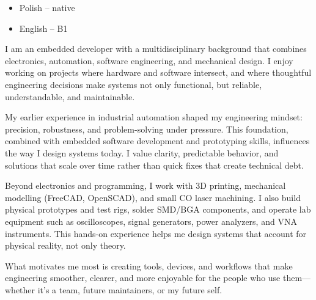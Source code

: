\documentclass[9pt]{developercv}
\begin{document}
\vspace{0.5cm}

\begin{minipage}[t]{0.3\textwidth}
	\vspace{-\baselineskip}
	
	\begin{itemize}
		\item Polish – native
		\item English – B1
	\end{itemize}
\end{minipage}


\vfill


\clearpage


I am an embedded developer with a multidisciplinary background that combines electronics,
automation, software engineering, and mechanical design. I enjoy working on projects where
hardware and software intersect, and where thoughtful engineering decisions make systems
not only functional, but reliable, understandable, and maintainable.

My earlier experience in industrial automation shaped my engineering mindset: precision,
robustness, and problem-solving under pressure. This foundation, combined with embedded
software development and prototyping skills, influences the way I design systems today.
I value clarity, predictable behavior, and solutions that scale over time rather than
quick fixes that create technical debt.

Beyond electronics and programming, I work with 3D printing, mechanical modelling
(FreeCAD, OpenSCAD), and small CO laser machining. I also build physical prototypes
and test rigs, solder SMD/BGA components, and operate lab equipment such as oscilloscopes,
signal generators, power analyzers, and VNA instruments. This hands-on experience helps
me design systems that account for physical reality, not only theory.

What motivates me most is creating tools, devices, and workflows that make engineering
smoother, clearer, and more enjoyable for the people who use them—whether it’s a team,
future maintainers, or my future self.


\end{document}
